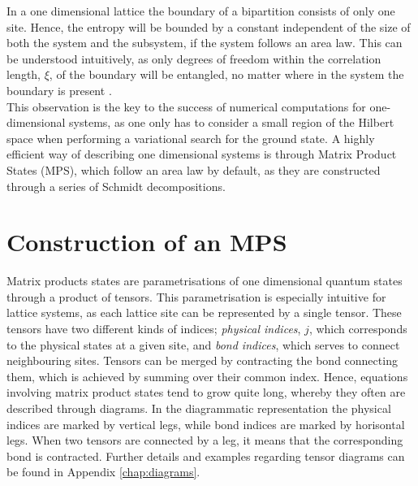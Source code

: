 In a one dimensional lattice the boundary of a bipartition consists of only one site. Hence, the entropy will be bounded by a constant independent of the size of both the system and the subsystem, if the system follows an area law. This can be understood intuitively, as only degrees of freedom within the correlation length, $\xi$, of the boundary will be entangled, no matter where in the system the boundary is present \cite{Hastings2007}.\\
This observation is the key to the success of numerical computations for one-dimensional systems, as one only has to consider a small region of the Hilbert space when performing a variational search for the ground state. A highly efficient way of describing one dimensional systems is through Matrix Product States (MPS), which follow an area law by default, as they are constructed through a series of Schmidt decompositions.


\section{Construction of an MPS} \label{sec:construct_MPS}
Matrix products states are parametrisations of one dimensional quantum states through a product of tensors. This parametrisation is especially intuitive for lattice systems, as each lattice site can be represented by a single tensor. These tensors have two different kinds of indices; \textit{physical indices}, $j$, which corresponds to the physical states at a given site, and \textit{bond indices}, which serves to connect neighbouring sites. Tensors can be merged by contracting the bond connecting them, which is achieved by summing over their common index. Hence, equations involving matrix product states tend to grow quite long, whereby they often are described through diagrams. In the diagrammatic representation the physical indices are marked by vertical legs, while bond indices are marked by horisontal legs. When two tensors are connected by a leg, it means that the corresponding bond is contracted. Further details and examples regarding tensor diagrams can be found in Appendix \ref{chap:diagrams}.\\

